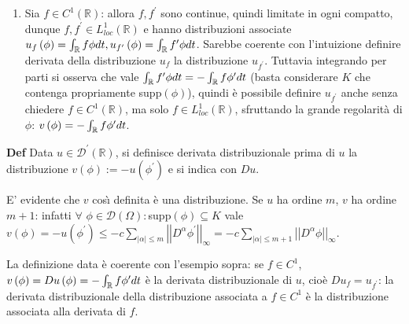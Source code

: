 \documentclass{article}
\begin{document}
\begin{enumerate}
\item Sia $f\in C^{1}\left( 
\mathbb{R}
\right) $: allora $f,f^{\prime }$ sono continue, quindi limitate in ogni
compatto, dunque $f,f^{\prime }\in L_{loc}^{1}\left( 
\mathbb{R}
\right) $ e hanno distribuzioni associate $u_{f}\left( \phi \right) =\int_{%
\mathbb{R}
}f\phi dt,u_{f^{\prime }}\left( \phi \right) =\int_{%
\mathbb{R}
}f^{\prime }\phi dt$. Sarebbe coerente con l'intuizione definire derivata
della distribuzione $u_{f}$ la distribuzione $u_{f^{\prime }}$. Tuttavia
integrando per parti si osserva che vale $\int_{%
\mathbb{R}
}f^{\prime }\phi dt=-\int_{%
\mathbb{R}
}f\phi ^{\prime }dt$ (basta considerare $K$ che contenga propriamente supp$%
\left( \phi \right) $), quindi \`{e} possibile definire $u_{f^{\prime }}$
anche senza chiedere $f\in C^{1}\left( 
\mathbb{R}
\right) $, ma solo $f\in L_{loc}^{1}\left( 
\mathbb{R}
\right) $, sfruttando la grande regolarit\`{a} di $\phi $: $v\left( \phi
\right) =-\int_{%
\mathbb{R}
}f\phi ^{\prime }dt$.
\end{enumerate}

\textbf{Def} Data $u\in \mathcal{D}^{\prime }\left( 
\mathbb{R}
\right) $, si definisce derivata distribuzionale prima di $u$ la
distribuzione $v\left( \phi \right) :=-u\left( \phi ^{\prime }\right) $ e si
indica con $Du$.

E' evidente che $v$ cos\`{\i} definita \`{e} una distribuzione. Se $u$ ha
ordine $m$, $v$ ha ordine $m+1$: infatti $\forall $ $\phi \in \mathcal{D}%
\left( \Omega \right) :$supp$\left( \phi \right) \subseteq K$ vale $v\left(
\phi \right) =-u\left( \phi ^{\prime }\right) \leq -c\sum_{\left\vert \alpha
\right\vert \leq m}\left\vert \left\vert D^{\alpha }\phi ^{\prime
}\right\vert \right\vert _{\infty }=-c\sum_{\left\vert \alpha \right\vert
\leq m+1}\left\vert \left\vert D^{\alpha }\phi \right\vert \right\vert
_{\infty }$.

La definizione data \`{e} coerente con l'esempio sopra: se $f\in C^{1}$, $%
v\left( \phi \right) =Du\left( \phi \right) =-\int_{%
\mathbb{R}
}f\phi ^{\prime }dt$ \`{e} la derivata distribuzionale di $u$, cio\`{e} $%
Du_{f}=u_{f^{\prime }}$: la derivata distribuzionale della distribuzione
associata a $f\in C^{1}$ \`{e} la distribuzione associata alla derivata di $%
f $.
\end{document}

